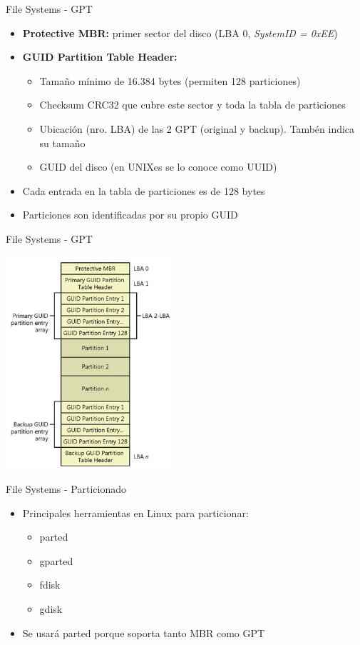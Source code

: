 \begin{frame}{File Systems - GPT}
 \begin{itemize}
  \item {\bf Protective MBR:} primer sector del disco (LBA 0, {\it SystemID = 0xEE})
  \item {\bf GUID Partition Table Header:}
  \begin{itemize}
   \item Tamaño mínimo de 16.384 bytes (permiten 128 particiones)
   \item Checksum CRC32 que cubre este sector y toda la tabla de particiones
   \item Ubicación (nro. LBA) de las 2 GPT (original y backup). Tambén indica su tamaño 
   \item GUID del disco (en UNIXes se lo conoce como UUID)
  \end{itemize}
  \item Cada entrada en la tabla de particiones es de 128 bytes
  \item Particiones son identificadas por su propio GUID
 \end{itemize}
\end{frame}

\begin{frame}{File Systems - GPT}
 \begin{center}
  \includegraphics[width=0.46\textwidth]{images/gpt3.png}
 \end{center}
\end{frame}

\begin{frame}{File Systems - Particionado}
 \begin{itemize}
  \item Principales herramientas en Linux para particionar:
  \begin{itemize}
   \item parted 
   \item gparted
   \item fdisk
   \item gdisk
  \end{itemize}
  \vspace{0.2cm}
  \item Se usará parted porque soporta tanto MBR como GPT
 \end{itemize}
\end{frame}

